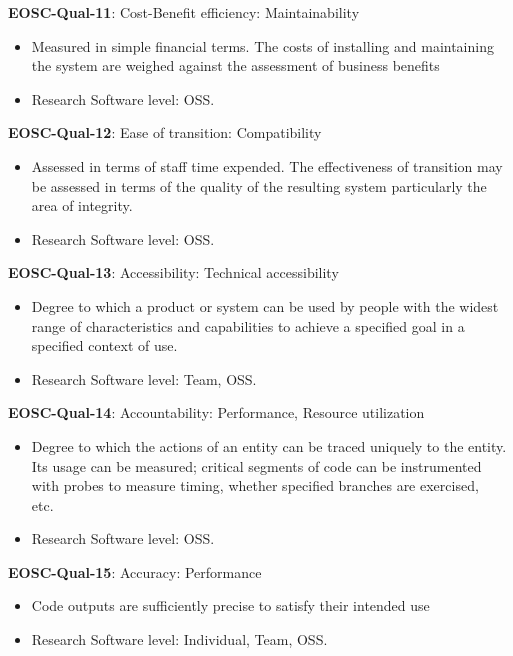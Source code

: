 \textbf{EOSC-Qual-11}: Cost-Benefit efficiency: Maintainability

\begin{itemize}
    \item Measured in simple financial terms. The costs of installing and maintaining the system are weighed against the assessment of business benefits~\cite{gillies_modelling_1992}
    \item Research Software level: OSS.
\end{itemize}

\textbf{EOSC-Qual-12}: Ease of transition: Compatibility

\begin{itemize}
    \item Assessed in terms of staff time expended. The effectiveness of transition may be assessed in terms of the quality of the resulting system particularly the area of integrity.~\cite{iso_25010_2011_2017,gillies_modelling_1992}
    \item Research Software level: OSS.
\end{itemize}

\textbf{EOSC-Qual-13}: Accessibility: Technical accessibility

\begin{itemize}
    \item Degree to which a product or system can be used by people with the widest range of characteristics and
capabilities to achieve a specified goal in a specified context of use.~\cite{iso_25010_2011_2017,boehm_quantitative_1976}
    \item Research Software level: Team, OSS.
\end{itemize}

\textbf{EOSC-Qual-14}: Accountability: Performance, Resource utilization

\begin{itemize}
    \item Degree to which the actions of an entity can be traced uniquely to the entity. Its usage can be measured; critical segments of code can be instrumented with probes to measure timing, whether specified branches are exercised, etc.~\cite{iso_25010_2011_2017,boehm_quantitative_1976}
    \item Research Software level: OSS.
\end{itemize}

\textbf{EOSC-Qual-15}: Accuracy: Performance

\begin{itemize}
    \item Code outputs are sufficiently precise to satisfy their intended use~\cite{boehm_quantitative_1976}
    \item Research Software level: Individual, Team, OSS.
\end{itemize}


